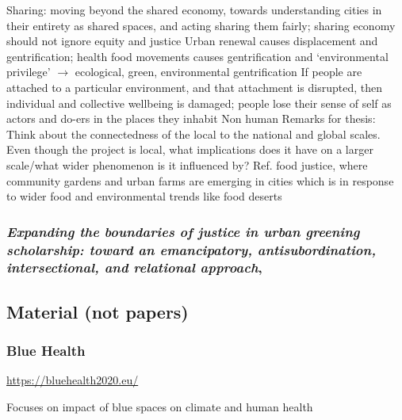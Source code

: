 \documentclass{article}
\begin{document}
\begin{outline}
		\2 Sharing: moving beyond the shared economy, towards understanding cities in their entirety as shared spaces, and acting sharing them fairly; sharing economy should not ignore equity and justice
		\2 Urban renewal causes displacement and gentrification; health food movements causes gentrification and `environmental privilege' $\rightarrow$ ecological, green, environmental gentrification
		\2 If people are attached to a particular environment, and that attachment is disrupted, then individual and collective wellbeing is damaged; people lose their sense of self as actors and do-ers in the places they inhabit
	\1 Non human
	\1 Remarks for thesis:
		\2 Think about the connectedness of the local to the national and global scales. Even though the project is local, what implications does it have on a larger scale/what wider phenomenon is it influenced by? Ref. food justice, where community gardens and urban farms are emerging in cities which is in response to wider food and environmental trends like food deserts
\end{outline}

\subsubsection{\textit{Expanding the boundaries of justice in urban greening scholarship: toward an emancipatory, antisubordination, intersectional, and relational approach}, \parencite{anguelovski2020expanding}}

\begin{outline}
	\1 
\end{outline}


\subsection{Material (not papers)}

\subsubsection{Blue Health}

\url{https://bluehealth2020.eu/}

\begin{outline}
	\1 Focuses on impact of blue spaces on climate and human health
\end{outline}
\end{document}
